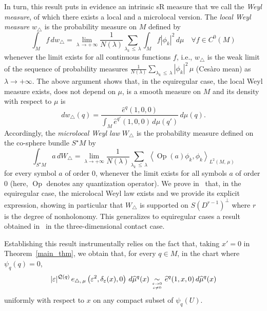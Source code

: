 \documentclass[10pt]{amsart}
\theoremstyle{definition}\newtheorem{defi}[theo]{Definition}\newtheorem{rema}[theo]{Remark}\newtheorem{exam}[theo]{Example}\newtheorem{exem}[theo]{Example}\newtheorem{nota}[theo]{Notation}
\newcommand{\calQ}{\mathcal{Q}}
\DeclareMathOperator{\Op}{Op}
\renewcommand{\leq}{\leqslant}
\let\oldforall\forall
\renewcommand*{\forall}{\mathrel{\oldforall}}
\begin{document}
In turn, this result puts in evidence an intrinsic sR measure that we call the \emph{Weyl measure}, of which there exists a local and a microlocal version. The \emph{local Weyl measure} $w_{\triangle}$ is the probability measure on $M$ defined by
\[
\int _M f \, dw_{\triangle} = \lim _{\lambda\,\rightarrow +\,\infty }\frac{1}{N(\lambda)}\sum _{\lambda_k\,\leq\,\lambda} \int_M f |\phi_k |^2 \, d\mu \quad \forall f\in C^0(M)
\]
whenever the limit exists for all continuous functions $f$, i.e., $w_{\triangle}$ is the weak limit of the sequence of probability measures $\frac{1}{N(\lambda)}\sum _{\lambda_k\,\leq\,\lambda } |\phi_k |^2 \, \mu $ (Cesàro mean) as $\lambda \rightarrow +\infty$. The above argument shows that, in the equiregular case, the local Weyl measure exists, does not depend on $\mu$, is a smooth measure on $M$ and its density with respect to $\mu$ is
\[
dw_{\triangle}(q) = \frac{\widehat{e}^{q}(1,0,0)}{\int_M \widehat{e}^{q'}(1,0,0)\, d\mu(q')} \, d\mu(q).
\]
Accordingly, the \emph{microlocal Weyl law} $W_\triangle$ is the probability measure defined on the co-sphere bundle $S^\star M$ by
\[
\int _{S^\star M} a \, dW_{\triangle} = \lim _{\lambda \rightarrow +\infty }\frac{1}{N(\lambda)}\sum _{\lambda_k\,\leq\, \lambda} \left\langle \Op (a)\phi_k, \phi_k \right\rangle_{L^2(M,\,\mu)}
\]
for every symbol $a$ of order $0$, whenever the limit exists for all symbols $a$ of order $0$ (here, $\Op$ denotes any quantization operator). We prove in~\cite{CHT-II} that, in the equiregular case, the microlocal Weyl law exists and we provide its explicit expression, showing in particular that $W_\triangle$ is supported on $S(D^{r-1})^\perp$ where $r$ is the degree of nonholonomy. This generalizes to equiregular cases a result obtained in~\cite{CHT-I} in the three-dimensional contact case.

Establishing this result instrumentally relies on the fact that, taking $x'=0$ in Theorem~\ref{main_thm}, we obtain that, for every $q\in M$, in the chart where $\psi_{q}(q)=0$,
\[
\vert\varepsilon\vert^{\calQ(q)}\, e_{\triangle,\,\mu}\left(\varepsilon^2,\delta_\varepsilon(x),0\right) \, d\widehat{\mu}^{q}(x)
\underset{\varepsilon\rightarrow 0\atop \varepsilon\neq 0}{\sim} \widehat{e}^{q}(1,x,0) \, d\widehat{\mu}^{q}(x)
\]
uniformly with respect to $x$ on any compact subset of $\psi_{q}(U)$.


\goodbreak
\end{document}
